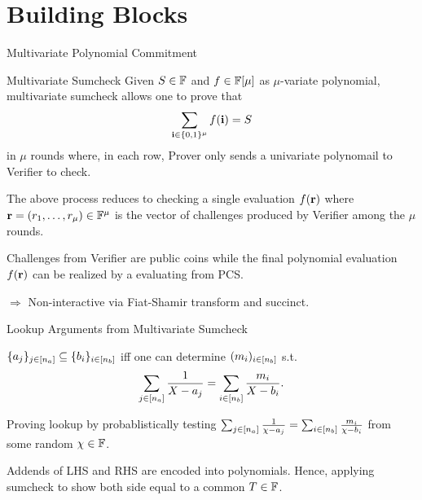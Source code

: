 \section{Building Blocks}
\begin{frame}{Multivariate Polynomial Commitment}
\end{frame}
\begin{frame}{Multivariate Sumcheck}
	Given $S \in \mathbb{F}$ and $f \in \mathbb{F}[\mu]$ as $\mu$-variate polynomial, multivariate sumcheck \cite{FOCS:LundFKN90} allows one to prove that 
	\begin{equation*}
		\sum_{\mathbf{i} \in \{0,1\}^\mu} f(\mathbf{i}) = S
	\end{equation*} 
	in $\mu$ rounds where, in each row, Prover only sends a univariate polynomail to Verifier to check.
	
	The above process reduces to checking a single evaluation $f(\mathbf{r})$ where $\mathbf{r} = (r_1, \dots, r_\mu) \in \mathbb{F}^\mu$ is the vector of challenges produced by Verifier among the $\mu$ rounds.
	
	Challenges from Verifier are public coins while the final polynomial evaluation $f(\mathbf{r})$ can be realized by a evaluating from PCS.
	
	$\Rightarrow$ Non-interactive via Fiat-Shamir transform \cite{CRYPTO:FiaSha86} and succinct.
\end{frame}

\begin{frame}{Lookup Arguments from Multivariate Sumcheck}
	\begin{lemma}
		$\{a_j\}_{j \in [{n_a}]} \subseteq \{b_i\}_{i \in [{n_b}]}$ iff one can determine $(m_i)_{i \in [{n_b}]}$ s.t.
		\begin{equation*}
			\sum_{j \in [{n_a}]}\frac{1}{X - a_j} = \sum_{i \in [{n_b}]}\frac{m_i}{X - b_i}.
		\end{equation*}
	\end{lemma}
	
	Proving lookup by probablistically testing $\sum_{j \in [{n_a}]}\frac{1}{\chi - a_j} = \sum_{i \in [{n_b}]}\frac{m_i}{\chi - b_i}$ from some random $\chi \in \mathbb{F}$.
	
	Addends of LHS and RHS are encoded into polynomials. Hence, applying sumcheck to show both side equal to a common $T \in \mathbb{F}$.
\end{frame}